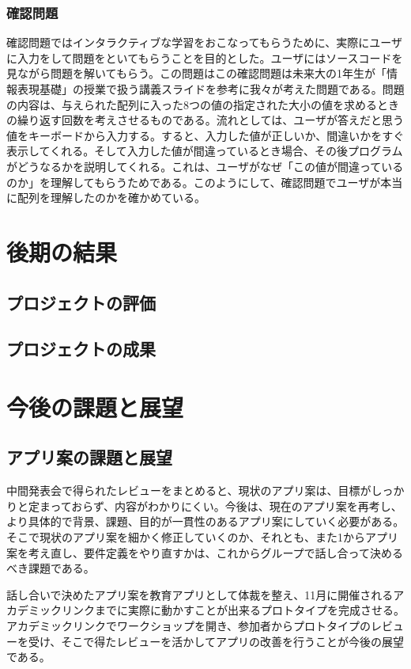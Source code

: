 \documentclass[openany,11pt,papersize]{jsbook}
\begin{document}
\subsection{確認問題}
確認問題ではインタラクティブな学習をおこなってもらうために、実際にユーザに入力をして問題をといてもらうことを目的とした。ユーザにはソースコードを見ながら問題を解いてもらう。この問題はこの確認問題は未来大の1年生が「情報表現基礎」の授業で扱う講義スライドを参考に我々が考えた問題である。問題の内容は、与えられた配列に入った8つの値の指定された大小の値を求めるときの繰り返す回数を考えさせるものである。流れとしては、ユーザが答えだと思う値をキーボードから入力する。すると、入力した値が正しいか、間違いかをすぐ表示してくれる。そして入力した値が間違っているとき場合、その後プログラムがどうなるかを説明してくれる。これは、ユーザがなぜ「この値が間違っているのか」を理解してもらうためである。このようにして、確認問題でユーザが本当に配列を理解したのかを確かめている。


\chapter{後期の結果}

\section{プロジェクトの評価}

\section{プロジェクトの成果}



\chapter{今後の課題と展望}
\section{アプリ案の課題と展望}
中間発表会で得られたレビューをまとめると、現状のアプリ案は、目標がしっかりと定まっておらず、内容がわかりにくい。今後は、現在のアプリ案を再考し、より具体的で背景、課題、目的が一貫性のあるアプリ案にしていく必要がある。そこで現状のアプリ案を細かく修正していくのか、それとも、また1からアプリ案を考え直し、要件定義をやり直すかは、これからグループで話し合って決めるべき課題である。
\par
話し合いで決めたアプリ案を教育アプリとして体裁を整え、11月に開催されるアカデミックリンクまでに実際に動かすことが出来るプロトタイプを完成させる。アカデミックリンクでワークショップを開き、参加者からプロトタイプのレビューを受け、そこで得たレビューを活かしてアプリの改善を行うことが今後の展望である。
\end{document}
